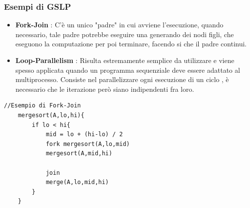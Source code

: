 \documentclass[10pt, letterpaper]{report}
\begin{document}
\subsubsection{Esempi di GSLP}\begin{itemize}
    \item \textbf{Fork-Join} : C'è un unico "padre" in cui avviene l'esecuzione, quando necessario, 
    tale padre potrebbe eseguire una  generando dei nodi figli, che eseguono la computazione 
    per poi terminare, facendo si che il padre continui.
    \item \textbf{Loop-Parallelism} : Risulta estremamente semplice da utilizzare e viene spesso applicata 
    quando un programma sequenziale deve essere adattato al multiprocesso. Consiste nel parallelizzare ogni 
    esecuzione di un ciclo , è necessario che le iterazione però siano indipendenti fra loro.
\end{itemize}
\begin{lstlisting}[style=CStyle]
    //Esempio di Fork-Join
    mergesort(A,lo,hi){
        if lo < hi{
            mid = lo + (hi-lo) / 2 
            fork mergesort(A,lo,mid)
            mergesort(A,mid,hi)

            join 
            merge(A,lo,mid,hi)
        }
    }
\end{lstlisting}
\flowerLine 
\end{document}

